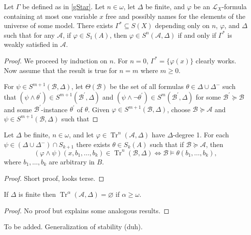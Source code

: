 \documentclass{article}
\DeclareMathOperator{\Tr}{Tr}
\let\mc\mathcal
\begin{document}
\begin{lemma}\label{dFinite}
    Let $\Gamma$ be defined as in \autoref{gStar}. Let $n \in \omega$, let $\Delta$ be finite, and $\varphi$ be an $\mc{L}_X$-formula containing at most one variable $x$ free and possibly names for the elements of the universe of some model. There exists $\Gamma^{*} \subseteq S(X)$ depending only on $n$, $\varphi$, and $\Delta$ such that for any $\mc{A}$, if $\varphi \in S_1(A)$, then $\varphi \in S^n(\mc{A}, \Delta)$ if and only if $\Gamma^{*}$ is weakly satisfied in $\mc{A}$.
\end{lemma}
\begin{proof}
    We proceed by induction on $n$. For $n = 0$, $\Gamma^{\ast} = \{ \varphi(x) \}$ clearly works. Now assume that the result is true for $n = m$ where $m \geq 0$.

    For $\psi \in S^{m+1}(\mc{B}, \Delta)$, let $\Theta(\mc{B})$ be the set of all formulas $\theta \in \Delta \cup \Delta^{-}$ such that $(\psi \land \theta^{\prime}) \in S^{m+1}(\mc{B}^{\prime}, \Delta)$ and $(\psi \land \neg\theta^{\prime}) \in S^m(\mc{B}^{\prime}, \Delta)$ for some $\mc{B}^{\prime} \succeq \mc{B}$ and some $\mc{B}^{\prime}$-instance $\theta^{\prime}$ of $\theta$. Given $\varphi \in S^{m+1}(\mc{B}, \Delta)$, choose $\mc{B} \succeq \mc{A}$ and $\psi \in S^{m+1}(\mc{B}, \Delta)$ such that 
\end{proof}

\begin{lemma}
    Let $\Delta$ be finite, $n \in \omega$, and let $\varphi \in \Tr^{n}(\mc{A}, \Delta)$ have $\Delta$-degree 1. For each $\psi \in (\Delta \cup \Delta^{-}) \cap S_{k+1}$ there exists $\theta \in S_k(A)$ such that if $\mc{B} \succeq \mc{A}$, then 
    \[ (\varphi \land \psi)(x, b_1, \ldots, b_k) \in \Tr^{n}(\mc{B}, \Delta) \Leftrightarrow \mc{B} \vDash \theta(b_1, \ldots, b_k), \]
    where $b_1, \ldots, b_k$ are arbitrary in $B$.
\end{lemma}
\begin{proof}
    Short proof, looks terse.
\end{proof}

\begin{lemma}
    If $\Delta$ is finite then $\Tr^{\alpha}(\mc{A}, \Delta) = \varnothing$ if $\alpha \geq \omega$.
\end{lemma}
\begin{proof}
    No proof but explains some analogous results.
\end{proof}

\begin{definition}
    To be added. Generalization of stability (duh).
\end{definition}
\end{document}
